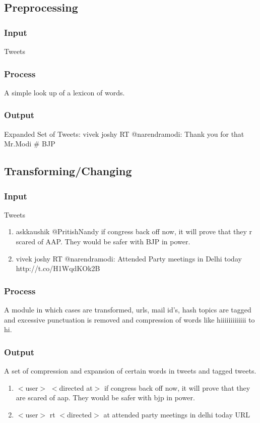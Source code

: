 \documentclass[conference]{IEEEtran}
\begin{document}
\subsection{\textbf{Preprocessing}}

\subsubsection{\textbf{Input}}
Tweets
\subsubsection{\textbf{Process}}
\par A simple look up of a lexicon of words.

\subsubsection{\textbf{Output}}
Expanded Set of Tweets: vivek joshy RT @narendramodi: Thank you for that Mr.Modi  \# BJP

\subsection{\textbf{Transforming/Changing}}

\subsubsection{\textbf{Input}}
Tweets
\begin{enumerate}
\item{askkaushik @PritishNandy if congress back off now, it will prove that they r scared of AAP. They would be safer with BJP in power.}
\item{vivek joshy RT @narendramodi: Attended Party meetings in Delhi today http://t.co/H1WqdKOk2B}
\end{enumerate}

\subsubsection{\textbf{Process}}
\par A module in which cases are transformed, urls, mail id’s, hash topics are tagged and excessive punctuation is removed and compression of words like hiiiiiiiiiiiii to hi.

\subsubsection{\textbf{Output}}
\par A set of compression and expansion of certain words in tweets and tagged tweets.
\begin{enumerate}
\item{$<$user$>$ $<$directed at$>$ if congress back off now, it will prove that they are scared of aap. They would be safer with bjp in power.}
\item{$<$user$>$ rt $<$directed$>$ at attended party meetings in delhi today URL}
\end{enumerate}
\end{document}
